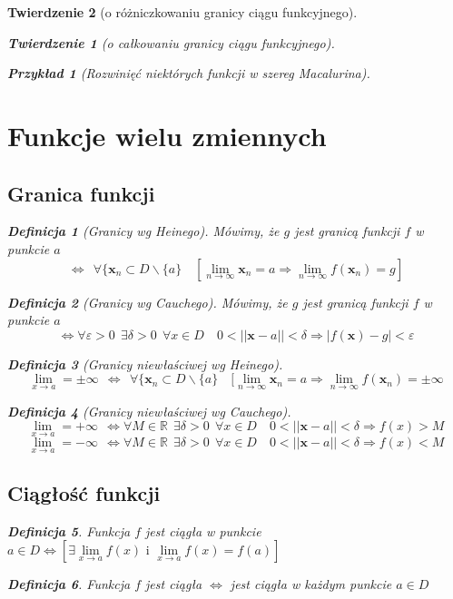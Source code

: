 \documentclass[12pt,a4paper]{article}
\newtheorem{tw}{Twierdzenie}
\newtheorem{przyklad}{Przykład}
\theoremstyle{definition}
\newtheorem{df}{Definicja}
\begin{document}
\begin{tw}[o różniczkowaniu granicy ciągu funkcyjnego]
\begin{tw}[o całkowaniu granicy ciągu funkcyjnego]
\begin{przyklad}[Rozwinięć niektórych funkcji w szereg Macalurina]
\section{Funkcje wielu zmiennych}
\subsection{Granica funkcji}
\begin{df}[Granicy wg Heinego]
Mówimy, że $g$ jest granicą funkcji $f$ w punkcie $a$
$$\Leftrightarrow ~~\forall \{\mathbf{x}_n \subset D \smallsetminus \{a\} \quad [\lim\limits_{n\to\infty}\mathbf{x}_n = a \Rightarrow \lim\limits_{n\to\infty}f(\mathbf{x}_n)=g]$$
\end{df}
\begin{df}[Granicy wg Cauchego]
Mówimy, że $g$ jest granicą funkcji $f$ w punkcie $a$
$$\Leftrightarrow \forall\varepsilon >0 ~~\exists \delta >0 ~~\forall x\in D \quad 0<||\mathbf{x} - a|| <\delta \Rightarrow |f(\mathbf{x})-g| < \varepsilon$$
\end{df}
\begin{df}[Granicy niewłaściwej wg Heinego]
$$\lim\limits_{x\to a} = \pm \infty~~\Leftrightarrow ~~\forall \{\mathbf{x}_n \subset D \smallsetminus \{a\} \quad [\lim\limits_{n\to\infty}\mathbf{x}_n = a \Rightarrow \lim\limits_{n\to\infty}f(\mathbf{x}_n)=\pm\infty$$
\end{df}
\begin{df}[Granicy niewłaściwej wg Cauchego]
$$\lim\limits_{x\to a} = +\infty~~\Leftrightarrow \forall M\in\mathbb{R}~~\exists \delta >0 ~~\forall x\in D \quad 0<||\mathbf{x} - a|| <\delta \Rightarrow f(x) > M$$
$$\lim\limits_{x\to a} = -\infty~~\Leftrightarrow \forall M\in\mathbb{R}~~\exists \delta >0 ~~\forall x\in D \quad 0<||\mathbf{x} - a|| <\delta \Rightarrow f(x) < M$$
\end{df}

\subsection{Ciągłość funkcji}
\begin{df}
Funkcja $f$ jest ciągła w punkcie $a\in D \Leftrightarrow [\exists \lim\limits_{x\to a}f(x) \mbox{ i } \lim\limits_{x\to a}f(x) = f(a)]$ 
\end{df}
\begin{df}
Funkcja $f$ jest ciągła $\Leftrightarrow$ jest ciągła w każdym punkcie $a\in D$
\end{df}


\end{przyklad}
\end{tw}
\end{tw}
\end{document}
